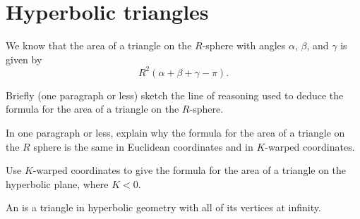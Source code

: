 \documentclass[newpage,hints,handout]{ximera}
\begin{document}


\section{Hyperbolic triangles}

We know that the area of a triangle on the $R$-sphere with angles
$\alpha$, $\beta$, and $\gamma$ is given by
\[
R^2(\alpha+\beta+\gamma - \pi).
\]
\begin{problem}
  Briefly (one paragraph or less) sketch the line of reasoning used to deduce the formula for
  the area of a triangle on the $R$-sphere.
\end{problem}

\begin{problem}
In one paragraph or less, explain why the formula for the area of a triangle on the $R$ sphere is the same in Euclidean coordinates and in $K$-warped coordinates.
\end{problem}

\begin{problem}
 Use $K$-warped coordinates to give the formula for the area of a triangle on the hyperbolic plane, where $K<0$.
\end{problem}

\begin{definition}
  An  is a triangle in hyperbolic geometry with all of
  its vertices at infinity.
\end{definition}
\end{document}
